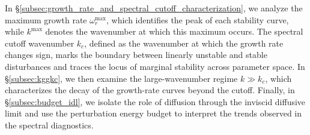 \documentclass[11pt]{article}
\begin{document}
In \S\ref{subsec:growth_rate_and_spectral_cutoff_characterization}, we analyze the maximum growth rate \(\omega_r^{\max}\), which identifies the peak of each stability curve, while \(k^{\max}\) denotes the wavenumber at which this maximum occurs. The spectral cutoff wavenumber \(k_c\), defined as the wavenumber at which the growth rate changes sign, marks the boundary between linearly unstable and stable disturbances and traces the locus of marginal stability across parameter space. In \S\ref{subsec:kggkc}, we then examine the large-wavenumber regime \(k \gg k_c\), which characterizes the decay of the growth-rate curves beyond the cutoff. Finally, in \S\ref{subsec:budget_idl}, we isolate the role of diffusion through the inviscid diffusive limit and use the perturbation energy budget to interpret the trends observed in the spectral diagnostics.
\end{document}
